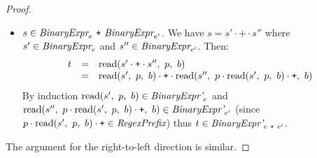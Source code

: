 \documentclass[preprint,10pt]{sigplanconf}
\begin{document}
\begin{proof}
\begin{itemize}
    \item \( s \in \textit{BinaryExpr}_{e} ~\texttt{+}~
      \textit{BinaryExpr}_{e'} \). We have \( s = s' \cdot \texttt{+}
      \cdot s'' \) where \( s' \in \textit{BinaryExpr}_{e} \) and \( s''
      \in \textit{BinaryExpr}_{e'} \). Then:
    \[
    \begin{array}{rcl}
      t &=& \textrm{read}(s'\cdot \texttt{+} \cdot s'',~p,~b)
      \\
      &=& \textrm{read}(s',~p,~b) \cdot \texttt{+} \cdot 
      \textrm{read}(s'',~
        p \cdot \textrm{read}(s',~p,~b) \cdot \texttt{+}
      ,~b)
    \end{array}
    \]
    By induction \( \textrm{read}(s',~p,~b) \in \textit{BinaryExpr'}_{e}
    \) and \( \textrm{read}(s'',~ p \cdot \textrm{read}(s',~p,~b) \cdot \texttt{+}
    ,~b) \in \textit{BinaryExpr'}_{e'} \) (since \( p \cdot
    \textrm{read}(s',~p,~b) \cdot \texttt{+} \in \textit{RegexPrefix} \)) thus \( t \in
    \textit{BinaryExpr'}_{e~\texttt{+}~e'} \).
  \end{itemize}
  
  The argument for the right-to-left direction is similar.
\end{proof}
\end{document}
